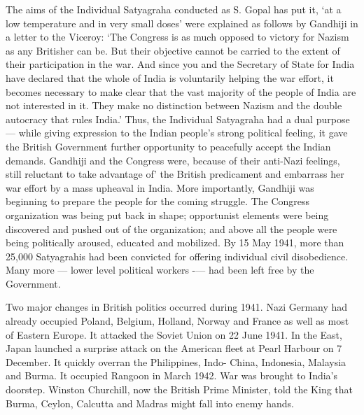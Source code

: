 The aims of the Individual Satyagraha conducted as S. Gopal has put it, `at a low temperature and in very small doses' were explained as follows by Gandhiji in a letter to the Viceroy: `The Congress is as much opposed to victory for Nazism as any Britisher can be. But their objective cannot be carried to the extent of their participation in the war. And since you and the Secretary of State for India have declared that the whole of India is voluntarily helping the war effort, it becomes necessary to make clear that the vast majority of the people of India are not interested in it. They make no distinction between Nazism and the double autocracy that rules India.' Thus, the Individual Satyagraha had a dual purpose — while giving expression to the Indian people's strong political feeling, it gave the British Government further opportunity to peacefully accept the Indian demands. Gandhiji and the Congress were, because of their anti-Nazi feelings, still reluctant to take advantage of' the British predicament and embarrass her war effort by a mass upheaval in India. More importantly, Gandhiji was beginning to prepare the people for the coming struggle. The Congress organization was being put back in shape; opportunist elements were being discovered and pushed out of the organization; and above all the people were being politically aroused, educated and mobilized. By 15 May 1941, more than 25,000 Satyagrahis had been convicted for offering individual civil disobedience. Many more — lower level political workers -— had been left free by the Government. 

Two major changes in British politics occurred during 1941. Nazi Germany had already occupied Poland, Belgium, Holland, Norway and France as well as most of Eastern Europe. It attacked the Soviet Union on 22 June 1941. In the East, Japan launched a surprise attack on the American fleet at Pearl Harbour on 7 December. It quickly overran the Philippines, Indo- China, Indonesia, Malaysia and Burma. It occupied Rangoon in March 1942. War was brought to India's doorstep. Winston Churchill, now the British Prime Minister, told the King that Burma, Ceylon, Calcutta and Madras might fall into enemy hands. 

